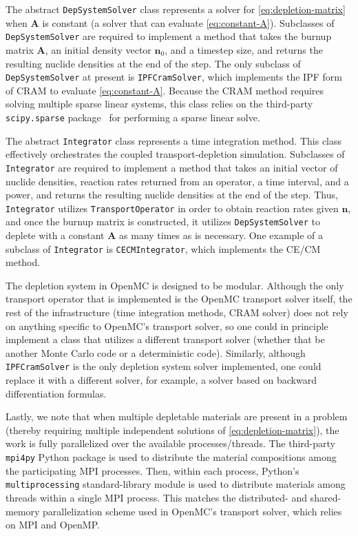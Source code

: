 \documentclass[3p,authoryear]{elsarticle}
\newcommand{\vect}[1]{\mathbf{#1}} %
\begin{document}
The abstract \texttt{DepSystemSolver} class represents a solver for
\cref{eq:depletion-matrix} when $\vect{A}$ is constant (a solver that can
evaluate \cref{eq:constant-A}). Subclasses of \texttt{DepSystemSolver} are
required to implement a method that takes the burnup matrix $\vect{A}$, an
initial density vector $\vect{n}_0$, and a timestep size, and returns the
resulting nuclide densities at the end of the step. The only subclass of
\texttt{DepSystemSolver} at present is \texttt{IPFCramSolver}, which implements
the IPF form of CRAM to evaluate \cref{eq:constant-A}. Because the CRAM method
requires solving multiple sparse linear systems, this class relies on the
third-party \texttt{scipy.sparse} package~\citep{virtanen2020nm} for performing
a sparse linear solve.

The abstract \texttt{Integrator} class represents a time integration method.
This class effectively orchestrates the coupled transport-depletion simulation.
Subclasses of \texttt{Integrator} are required to implement a method that takes
an initial vector of nuclide densities, reaction rates returned from an
operator, a time interval, and a power, and returns the resulting nuclide
densities at the end of the step. Thus, \texttt{Integrator} utilizes
\texttt{TransportOperator} in order to obtain reaction rates given $\vect{n}$,
and once the burnup matrix is constructed, it utilizes \texttt{DepSystemSolver}
to deplete with a constant $\vect{A}$ as many times as is necessary. One example
of a subclass of \texttt{Integrator} is \texttt{CECMIntegrator}, which
implements the CE/CM method.

The depletion system in OpenMC is designed to be modular. Although the only
transport operator that is implemented is the OpenMC transport solver itself,
the rest of the infrastructure (time integration methods, CRAM solver) does not
rely on anything specific to OpenMC's transport solver, so one could in
principle implement a class that utilizes a different transport solver (whether
that be another Monte Carlo code or a deterministic code). Similarly, although
\texttt{IPFCramSolver} is the only depletion system solver implemented, one
could replace it with a different solver, for example, a solver based on
backward differentiation formulas.

Lastly, we note that when multiple depletable materials are present in a problem
(thereby requiring multiple independent solutions of
\cref{eq:depletion-matrix}), the work is fully parallelized over the available
processes/threads. The third-party \texttt{mpi4py} Python package is used to
distribute the material compositions among the participating MPI processes.
Then, within each process, Python's \texttt{multiprocessing} standard-library
module is used to distribute materials among threads within a single MPI
process. This matches the distributed- and shared-memory parallelization scheme
used in OpenMC's transport solver, which relies on MPI and OpenMP.
\end{document}
